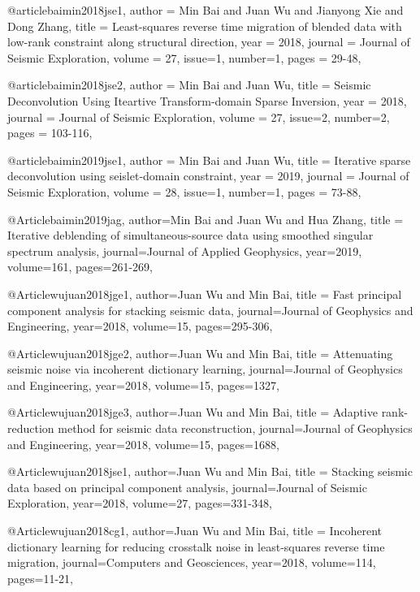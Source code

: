 {@article{baimin2018jse1,
  author =	 {Min Bai and Juan Wu and Jianyong Xie and Dong Zhang},
  title =	 {Least-squares reverse time migration of blended data with low-rank constraint along structural direction},
  year =	 2018,
  journal =	 {Journal of Seismic Exploration},
  volume =	 27,
  issue=1,
  number=1,
  pages =	 {29-48},
}

@article{baimin2018jse2,
  author =	 {Min Bai and Juan Wu},
  title =	 {Seismic Deconvolution Using Iteartive Transform-domain Sparse Inversion},
  year =	 2018,
  journal =	 {Journal of Seismic Exploration},
  volume =	 27,
  issue=2,
  number=2,
  pages =	 {103-116},
}

@article{baimin2019jse1,
  author =	 {Min Bai and Juan Wu},
  title =	 {Iterative sparse deconvolution using seislet-domain constraint},
  year =	 2019,
  journal =	 {Journal of Seismic Exploration},
  volume =	 28,
  issue=1,
  number=1,
  pages =	 {73-88},
}

@Article{baimin2019jag,
  author={Min Bai and Juan Wu and Hua Zhang},
  title = {Iterative deblending of simultaneous-source data using smoothed singular spectrum analysis},
  journal={Journal of Applied Geophysics},
  year=2019,
  volume=161,
  pages={261-269},
}


@Article{wujuan2018jge1,
  author={Juan Wu and Min Bai},
  title = {Fast principal component analysis for stacking seismic data},
  journal={Journal of Geophysics and Engineering},
  year=2018,
  volume=15,
  pages={295-306},
}

@Article{wujuan2018jge2,
  author={Juan Wu and Min Bai},
  title = {Attenuating seismic noise via incoherent dictionary learning},
  journal={Journal of Geophysics and Engineering},
  year=2018,
  volume=15,
  pages={1327},
}

@Article{wujuan2018jge3,
  author={Juan Wu and Min Bai},
  title = {Adaptive rank-reduction method for seismic data reconstruction},
  journal={Journal of Geophysics and Engineering},
  year=2018,
  volume=15,
  pages={1688},
}

@Article{wujuan2018jse1,
  author={Juan Wu and Min Bai},
  title = {Stacking seismic data based on principal component analysis},
  journal={Journal of Seismic Exploration},
  year=2018,
  volume=27,
  pages={331-348},
}

@Article{wujuan2018cg1,
  author={Juan Wu and Min Bai},
  title = {Incoherent dictionary learning for reducing crosstalk noise in least-squares reverse time migration},
  journal={Computers and Geosciences},
  year=2018,
  volume=114,
  pages={11-21},
}

}
